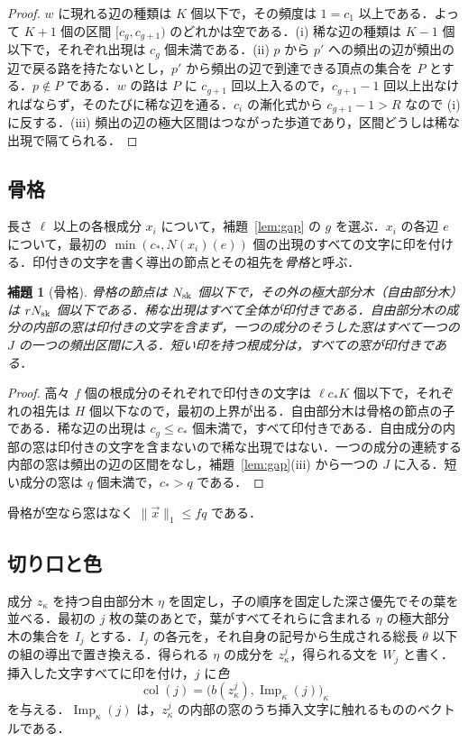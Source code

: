 \documentclass[11pt,a4paper]{ltjsarticle}
\numberwithin{equation}{section}
\theoremstyle{plain}
\newtheorem{lemma}[theorem]{補題}
\theoremstyle{definition}
\theoremstyle{remark}
\theoremstyle{plain}
\newcommand{\tuple}[1]{\vec{#1}}
\newcommand{\Imp}{\operatorname{Imp}}
\begin{document}
\begin{proof}
$w$ に現れる辺の種類は $K$ 個以下で，その頻度は $1=c_1$ 以上である．よって $K+1$ 個の区間 $[c_g,c_{g+1})$ のどれかは空である．(i) 稀な辺の種類は $K-1$ 個以下で，それぞれ出現は $c_g$ 個未満である．(ii) $p$ から $p'$ への頻出の辺が頻出の辺で戻る路を持たないとし，$p'$ から頻出の辺で到達できる頂点の集合を $P$ とする．$p\notin P$ である．$w$ の路は $P$ に $c_{g+1}$ 回以上入るので，$c_{g+1}-1$ 回以上出なければならず，そのたびに稀な辺を通る．$c_i$ の漸化式から $c_{g+1}-1>R$ なので (i) に反する．(iii) 頻出の辺の極大区間はつながった歩道であり，区間どうしは稀な出現で隔てられる．
\end{proof}

\subsection{骨格}

長さ $\ell$ 以上の各根成分 $x_i$ について，補題~\ref{lem:gap} の $g$ を選ぶ．$x_i$ の各辺 $e$ について，最初の $\min(c_*,N(x_i)(e))$ 個の出現のすべての文字に印を付ける．印付きの文字を書く導出の節点とその祖先を\emph{骨格}と呼ぶ．

\begin{lemma}[骨格]
\label{lem:skeleton}
骨格の節点は $N_{\rm sk}$ 個以下で，その外の極大部分木（\emph{自由部分木}）は $rN_{\rm sk}$ 個以下である．稀な出現はすべて全体が印付きである．自由部分木の成分の内部の窓は印付きの文字を含まず，一つの成分のそうした窓はすべて一つの $J$ の一つの頻出区間に入る．短い印を持つ根成分は，すべての窓が印付きである．
\end{lemma}

\begin{proof}
高々 $f$ 個の根成分のそれぞれで印付きの文字は $\ell c_*K$ 個以下で，それぞれの祖先は $H$ 個以下なので，最初の上界が出る．自由部分木は骨格の節点の子である．稀な辺の出現は $c_g\le c_*$ 個未満で，すべて印付きである．自由成分の内部の窓は印付きの文字を含まないので稀な出現ではない．一つの成分の連続する内部の窓は頻出の辺の区間をなし，補題~\ref{lem:gap}(iii) から一つの $J$ に入る．短い成分の窓は $q$ 個未満で，$c_*>q$ である．
\end{proof}

骨格が空なら窓はなく $\|\tuple x\|_1\le fq$ である．

\subsection{切り口と色}

成分 $z_\kappa$ を持つ自由部分木 $\eta$ を固定し，子の順序を固定した深さ優先でその葉を並べる．最初の $j$ 枚の葉のあとで，葉がすべてそれらに含まれる $\eta$ の極大部分木の集合を $I_j$ とする．$I_j$ の各元を，それ自身の記号から生成される総長 $\theta$ 以下の組の導出で置き換える．得られる $\eta$ の成分を $z^j_\kappa$，得られる文を $W_j$ と書く．挿入した文字すべてに印を付け，$j$ に\emph{色}
\[
  \operatorname{col}(j)=\bigl(b(z^j_\kappa),\Imp_\kappa(j)\bigr)_\kappa
\]
を与える．$\Imp_\kappa(j)$ は，$z^j_\kappa$ の内部の窓のうち挿入文字に触れるもののベクトルである．
\end{document}
